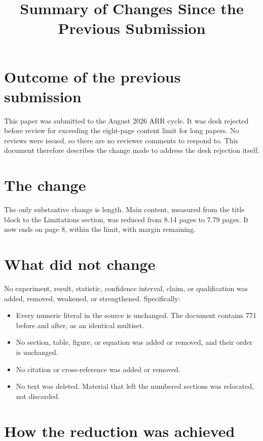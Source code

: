 \documentclass[11pt]{article}
\title{\vspace{-2.5em}Summary of Changes Since the Previous Submission\vspace{-0.5em}}
\date{}
\begin{document}
\maketitle
\vspace{-3em}

\section*{Outcome of the previous submission}

This paper was submitted to the August 2026 ARR cycle. It was desk rejected
before review for exceeding the eight-page content limit for long papers. No
reviews were issued, so there are no reviewer comments to respond to. This
document therefore describes the change made to address the desk rejection
itself.

\section*{The change}

The only substantive change is length. Main content, measured from the title
block to the Limitations section, was reduced from 8.14 pages to 7.79 pages. It
now ends on page 8, within the limit, with margin remaining.

\section*{What did not change}

No experiment, result, statistic, confidence interval, claim, or qualification
was added, removed, weakened, or strengthened. Specifically:

\begin{itemize}[nosep,leftmargin=1.5em]
  \item Every numeric literal in the source is unchanged. The document contains
        771 before and after, as an identical multiset.
  \item No section, table, figure, or equation was added or removed, and their
        order is unchanged.
  \item No citation or cross-reference was added or removed.
  \item No text was deleted. Material that left the numbered sections was
        relocated, not discarded.
\end{itemize}

\section*{How the reduction was achieved}
\end{document}
